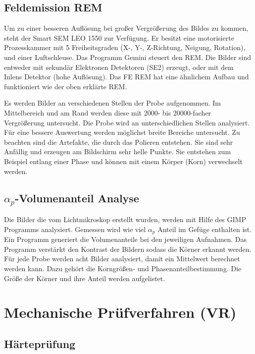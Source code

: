 \subsection*{Feldemission REM}
Um zu einer besseren Auflösung bei großer Vergrößerung des Bildes zu kommen, steht der Smart SEM LEO 1550 zur Verfügung. Er besitzt eine motorisierte Prozesskammer mit 5 Freiheitsgraden (X-, Y-, Z-Richtung, Neigung, Rotation), und einer Luftschleuse. Das Programm Gemini steuert den REM. Die Bilder sind entweder mit sekundär Elektronen Detektoren (SE2) erzeugt, oder mit dem Inlens Detektor (hohe Auflösung). Das FE REM hat eine ähnlichem Aufbau und funktioniert wie der oben erklärte REM.

Es werden Bilder an verschiedenen Stellen der Probe aufgenommen. Im Mittelbereich und am Rand werden diese mit 2000- bis 20000-facher Vergrößerung untersucht. Die Probe wird an unterschiedlichen Stellen analysiert. Für eine bessere Auswertung werden möglichst breite Bereiche untersucht. Zu beachten sind die Artefakte, die durch das Polieren entstehen. Sie sind sehr Anfällig und erzeugen am Bildschirm sehr helle Punkte. Sie entstehen zum Beispiel entlang einer Phase und können mit einem Körper (Korn) verwechselt werden.

\subsection*{$\alpha_{p}$-Volumenanteil Analyse}

Die Bilder die vom Lichtmikroskop erstellt wurden, werden mit Hilfe des GIMP Programms analysiert. Gemessen wird wie viel $\alpha_{p}$ Anteil im Gefüge enthalten ist. Ein Programm generiert die Volumenanteile bei den jeweiligen Aufnahmen. Das Programm verstärkt den Kontrast der Bildern sodass die Körner erkannt werden. Für jede Probe werden acht Bilder analysiert, damit ein Mittelwert berechnet werden kann. Dazu gehört die Korngrößen- und Phasenanteilbestimmung. Die Größe der Körner und ihre Anteil werden aufgelistet. 

\section{Mechanische Prüfverfahren (VR)}

\subsection*{Härteprüfung}

